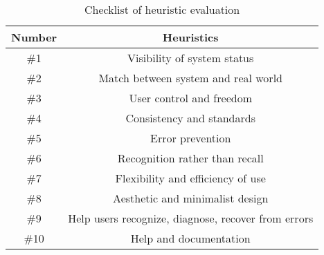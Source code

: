 \begin{table}[h]
    \centering
    \caption{Checklist of heuristic evaluation}
    \vspace{0.2cm}
    \begin{tabular}{|c|c|}
        \hline
        \textbf{\small{Number}} & \textbf{\small{Heuristics}}\\
        \hline
        \hline \small{\#1} & \small{Visibility of system status}\\
        \hline
        \small{\#2} & \small{Match between system and real world}\\
        \hline
        \small{\#3} & \small{User control and freedom}\\
        \hline
        \small{\#4} & \small{Consistency and standards}\\
        \hline
        \small{\#5} & \small{Error prevention}\\
        \hline
        \small{\#6} & \small{Recognition rather than recall}\\
        \hline
        \small{\#7} & \small{Flexibility and efficiency of use}\\
        \hline
        \small{\#8} & \small{Aesthetic and minimalist design}\\
        \hline
        \small{\#9} & \small{Help users recognize, diagnose, recover from errors}\\
        \hline
        \small{\#10} & \small{Help and documentation}\\
        \hline
    \end{tabular}
    \label{tab:heuristics}
\end{table}

